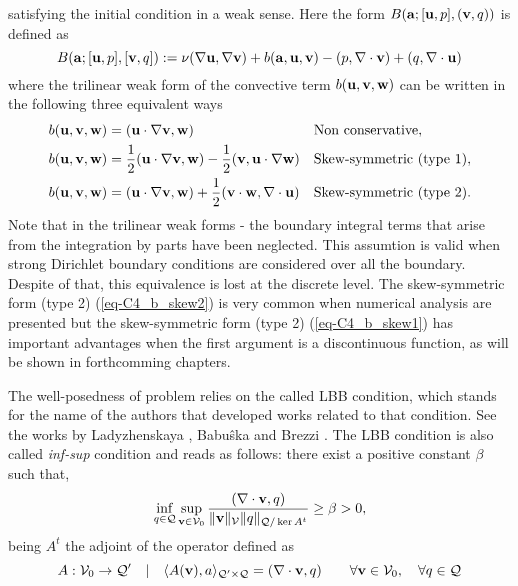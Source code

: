 satisfying the initial condition  in a weak sense. Here the form $B({{\bf a}};[{\bf u},p],({\bf v},q))$ is defined as 
\begin{equation}
\label{eq-C2_bilinear}
B({\bf a};[{\bf u},p],[{\bf v},q]):=\nu(\nabla{\bf u},\nabla{\bf v})+b({\bf a},{\bf u},{\bf v})-(p,\nabla\cdot{\bf v})+(q,\nabla\cdot{\bf u})
\end{equation}
where the trilinear weak form of the convective term $b({\bf u},{\bf v},{\bf w})$ can be written in the following three equivalent ways
\begin{align}
\label{eq-C2_b_noskew}
&b({\bf u},{\bf v},{\bf w})=({\bf u}\cdot\nabla{\bf v},{\bf w})&&\mbox{Non conservative},\\
\label{eq-C2_b_skew1}
&b({\bf u},{\bf v},\mathbf{w})=\frac{1}{2}({\bf u}\cdot\nabla{\bf v},\mathbf{w})-\frac{1}{2}({\bf v},{\bf u}\cdot\nabla\mathbf{w})&&\mbox{Skew-symmetric (type 1)},\\
\label{eq-C2_b_skew2}
&b({\bf u},{\bf v},\mathbf{w})=({\bf u}\cdot\nabla{\bf v},\mathbf{w})+\frac{1}{2}({\bf v}\cdot\mathbf{w},\nabla\cdot{\bf u})&&\mbox{Skew-symmetric (type 2)}.
\end{align}
Note that in the trilinear weak forms - the boundary integral terms that arise from the integration by parts have been neglected. This assumtion is valid when strong Dirichlet boundary conditions are considered over all the boundary. Despite of that, this equivalence is lost at the discrete level. The skew-symmetric form (type 2) (\ref{eq-C4_b_skew2}) is very common when numerical analysis are presented \cite{badia_convergence_2014,burman_galerkin_2009,guermond_faedogalerkin_2007} but the skew-symmetric form (type 2) (\ref{eq-C4_b_skew1}) has important advantages when the first argument is a discontinuous function, as will be shown in forthcomming chapters.

The well-posedness of problem  relies on the called LBB condition, which stands for the name of the authors that developed works related to that condition. See the works by Ladyzhenskaya \cite{ladyzhenskaya1969mathematical}, Babu\^{s}ka \cite{babuska_error-bounds_1971} and Brezzi \cite{brezzi1974existence}. The LBB condition is also called \textit{inf-sup} condition and reads as follows: there exist a positive constant $ \beta $ such that,
\begin{equation}
\label{eq-C2_lbb}
\inf_{q\in\mathcal{Q}}\sup_{{\bf v}\in\mathcal{V}_0}\frac{(\nabla\cdot{\bf v},q)}{\|{\bf v}\|_\mathcal{V}\|q\|_{\mathcal{Q}/\ker A^t}}\ge\beta>0,
\end{equation}
being $ A^t $ the adjoint of the operator defined as 
\begin{equation}
\label{eq-C2_lbb_operator}
A: \mathcal{V}_0\rightarrow\mathcal{Q'} \quad| \quad\langle A({\bf v}),a\rangle_{\mathcal{Q'}\times\mathcal{Q}}=(\nabla\cdot{\bf v},q)\quad\quad\forall{\bf v}\in\mathcal{V}_0,\quad\forall q\in\mathcal{Q}
\end{equation}

